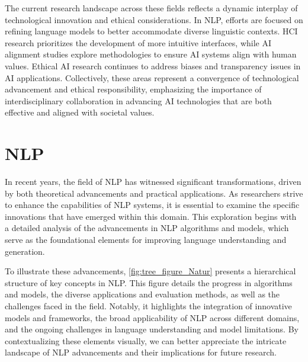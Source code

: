 The current research landscape across these fields reflects a dynamic interplay of technological innovation and ethical considerations. In NLP, efforts are focused on refining language models to better accommodate diverse linguistic contexts. HCI research prioritizes the development of more intuitive interfaces, while AI alignment studies explore methodologies to ensure AI systems align with human values. Ethical AI research continues to address biases and transparency issues in AI applications. Collectively, these areas represent a convergence of technological advancement and ethical responsibility, emphasizing the importance of interdisciplinary collaboration in advancing AI technologies that are both effective and aligned with societal values.













\section{NLP} \label{sec:NLP}


In recent years, the field of NLP has witnessed significant transformations, driven by both theoretical advancements and practical applications. As researchers strive to enhance the capabilities of NLP systems, it is essential to examine the specific innovations that have emerged within this domain. This exploration begins with a detailed analysis of the advancements in NLP algorithms and models, which serve as the foundational elements for improving language understanding and generation. 

To illustrate these advancements, \autoref{fig:tree_figure_Natur} presents a hierarchical structure of key concepts in NLP. This figure details the progress in algorithms and models, the diverse applications and evaluation methods, as well as the challenges faced in the field. Notably, it highlights the integration of innovative models and frameworks, the broad applicability of NLP across different domains, and the ongoing challenges in language understanding and model limitations. By contextualizing these elements visually, we can better appreciate the intricate landscape of NLP advancements and their implications for future research.


 






